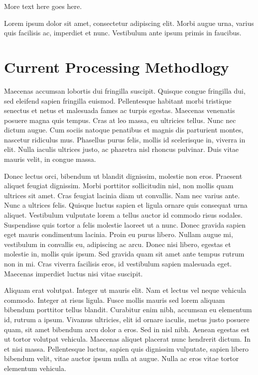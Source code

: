 More text here goes here.


Lorem ipsum dolor sit amet, consectetur adipiscing elit. Morbi augue urna, varius quis facilisis ac, imperdiet et nunc. Vestibulum ante ipsum primis in faucibus. 

\section{Current Processing Methodlogy}
Maecenas accumsan lobortis dui fringilla suscipit. Quisque congue fringilla dui, sed eleifend sapien fringilla euismod. Pellentesque habitant morbi tristique senectus et netus et malesuada fames ac turpis egestas. Maecenas venenatis posuere magna quis tempus. Cras at leo massa, eu ultricies tellus. Nunc nec dictum augue. Cum sociis natoque penatibus et magnis dis parturient montes, nascetur ridiculus mus. Phasellus purus felis, mollis id scelerisque in, viverra in elit. Nulla iaculis ultrices justo, ac pharetra nisl rhoncus pulvinar. Duis vitae mauris velit, in congue massa.

Donec lectus orci, bibendum ut blandit dignissim, molestie non eros. Praesent aliquet feugiat dignissim. Morbi porttitor sollicitudin nisl, non mollis quam ultrices sit amet. Cras feugiat lacinia diam ut convallis. Nam nec varius ante. Nunc a ultrices felis. Quisque luctus sapien et ligula ornare quis consequat urna aliquet. Vestibulum vulputate lorem a tellus auctor id commodo risus sodales. Suspendisse quis tortor a felis molestie laoreet ut a nunc. Donec gravida sapien eget mauris condimentum lacinia. Proin eu purus libero. Nullam augue mi, vestibulum in convallis eu, adipiscing ac arcu. Donec nisi libero, egestas et molestie in, mollis quis ipsum. Sed gravida quam sit amet ante tempus rutrum non in mi. Cras viverra facilisis eros, id vestibulum sapien malesuada eget. Maecenas imperdiet luctus nisi vitae suscipit.



Aliquam erat volutpat. Integer ut mauris elit. Nam et lectus vel neque vehicula commodo. Integer at risus ligula. Fusce mollis mauris sed lorem aliquam bibendum porttitor tellus blandit. Curabitur enim nibh, accumsan eu elementum id, rutrum a ipsum. Vivamus ultricies, elit id ornare iaculis, metus justo posuere quam, sit amet bibendum arcu dolor a eros. Sed in nisl nibh. Aenean egestas est ut tortor volutpat vehicula. Maecenas aliquet placerat nunc hendrerit dictum. In et nisi massa. Pellentesque luctus, sapien quis dignissim vulputate, sapien libero bibendum velit, vitae auctor ipsum nulla at augue. Nulla ac eros vitae tortor elementum vehicula.

